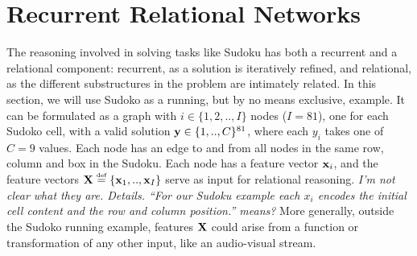 \def\csf{\mathsf{c}}
\def\fsf{\mathsf{f}}
\def\hsf{\mathsf{h}}
\def\isf{\mathsf{i}}
\def\osf{\mathsf{o}}
\def\usf{\mathsf{u}}
\def\wsf{\mathsf{w}}
\def\ysf{\mathsf{y}}

\def\defined{\stackrel{\text{\tiny def}}{=}}
\def\isitequal{\stackrel{\text{\tiny ?}}{=}}

\newcommand{\comment}[1]{\textcolor{blue}{\it [{#1}]}}
\newcommand{\cleancomment}[1]{\textcolor{blue}{\it {#1}}}
\newcommand{\todo}[1]{\textcolor{blue}{\it {\bf To do:} {#1}}}


\newcommand{\tblue}[1]{\textcolor{blue}{#1}}
\newcommand{\tpurple}[1]{\textcolor{Purple}{#1}}
\newcommand{\tred}[1]{\textcolor{red}{#1}}
\newcommand{\tgreen}[1]{\textcolor{DarkGreen}{#1}}
\newcommand{\tlightgray}[1]{\textcolor{LightGray}{#1}}

\section{Recurrent Relational Networks}

The reasoning involved in solving tasks like Sudoku has both a recurrent and a relational component: recurrent, as a solution is iteratively refined, and relational, as the different substructures in the problem are intimately related.
In this section, we will use Sudoko as a running, but by no means exclusive, example.
It can be formulated as a graph with $i \in \{1,2, .., I \}$ nodes ($I = 81$), one for each Sudoko cell, with a valid solution $\mathbf{y} \in \{ 1, .., C \}^{81}$, where each $y_i$ takes one of $C = 9$ values.
Each node has an edge to and from all nodes in the same row, column and box in the Sudoku.
Each node has a feature vector $\mathbf{x}_i$, and the feature vectors
$\X \defined \{\x_1, .., \x_{I}\}$ serve as input for relational reasoning.
\emph{I'm not clear what they are. Details. ``For our Sudoku example each $x_i$ encodes the initial cell content and the row and column position.'' means?}
More generally, outside the Sudoko running example, features $\mathbf{X}$ could arise from a function or transformation of any other input,
like an audio-visual stream.

